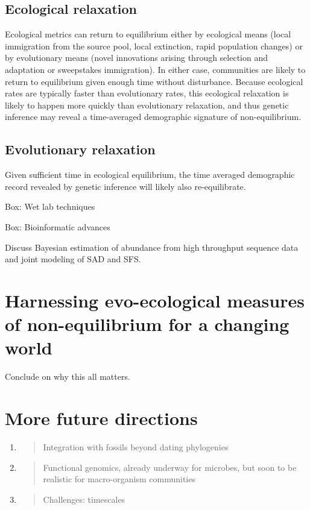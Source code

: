 \documentclass[]{article}
\begin{document}
\subsection{Ecological relaxation}\label{ecological-relaxation}

Ecological metrics can return to equilibrium either by ecological means
(local immigration from the source pool, local extinction, rapid
population changes) or by evolutionary means (novel innovations arising
through selection and adaptation or sweepstakes immigration). In either
case, communities are likely to return to equilibrium given enough time
without disturbance. Because ecological rates are typically faster than
evolutionary rates, this ecological relaxation is likely to happen more
quickly than evolutionary relaxation, and thus genetic inference may
reveal a time-averaged demographic signature of non-equilibrium.

\subsection{Evolutionary relaxation}\label{evolutionary-relaxation}

Given sufficient time in ecological equilibrium, the time averaged
demographic record revealed by genetic inference will likely also
re-equilibrate.

Box: Wet lab techniques

Box: Bioinformatic advances

Discuss Bayesian estimation of abundance from high throughput sequence
data and joint modeling of SAD and SFS.

\section{Harnessing evo-ecological measures of non-equilibrium for a
changing
world}\label{harnessing-evo-ecological-measures-of-non-equilibrium-for-a-changing-world}

Conclude on why this all matters.

\section{More future directions}\label{more-future-directions}

\begin{enumerate}
\def\labelenumi{\arabic{enumi}.}
\item
  \begin{quote}
  Integration with fossils beyond dating phylogenies
  \end{quote}
\item
  \begin{quote}
  Functional genomics, already underway for microbes, but soon to be
  realistic for macro-organism communities
  \end{quote}
\item
  \begin{quote}
  Challenges: timescales
  \end{quote}
\end{enumerate}
\end{document}
